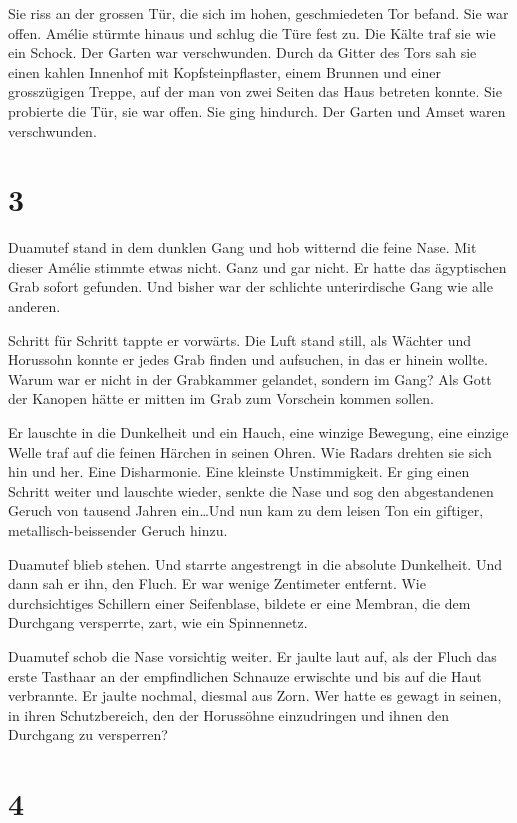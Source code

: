 \documentclass[11pt,titlepage,a5paper]{book}
\begin{document}
Sie riss an der grossen Tür, die sich im hohen, geschmiedeten Tor befand. Sie war offen. Amélie stürmte hinaus und schlug die Türe fest zu. Die Kälte traf sie wie ein Schock. Der Garten war verschwunden. Durch da Gitter des Tors sah sie einen kahlen Innenhof mit Kopfsteinpflaster, einem Brunnen und einer grosszügigen Treppe, auf der man von zwei Seiten das Haus betreten konnte. Sie probierte die Tür, sie war offen. Sie ging hindurch. Der Garten und Amset waren verschwunden.

\section*{3}


Duamutef stand in dem dunklen Gang und hob witternd die feine Nase. Mit dieser Amélie stimmte etwas nicht. Ganz und gar nicht. Er hatte das ägyptischen Grab sofort gefunden. Und bisher war der schlichte unterirdische Gang wie alle anderen. 

Schritt für Schritt tappte er vorwärts. Die Luft stand still, als Wächter und Horussohn konnte er jedes Grab finden und aufsuchen, in das er hinein wollte. Warum war er nicht in der Grabkammer gelandet, sondern im Gang? Als Gott der Kanopen hätte er mitten im Grab zum Vorschein kommen sollen. 

Er lauschte in die Dunkelheit und ein Hauch, eine winzige Bewegung, eine einzige Welle traf auf die feinen Härchen in seinen Ohren. Wie Radars drehten sie sich hin und her. Eine Disharmonie. Eine kleinste Unstimmigkeit. Er ging einen Schritt weiter und lauschte wieder, senkte die Nase und sog den abgestandenen Geruch von tausend Jahren ein\dots Und nun kam zu dem leisen Ton ein giftiger, metallisch-beissender Geruch hinzu. 

Duamutef blieb stehen. Und starrte angestrengt in die absolute Dunkelheit. Und dann sah er ihn, den Fluch. Er war wenige Zentimeter entfernt. Wie durchsichtiges Schillern einer Seifenblase, bildete er eine Membran, die dem Durchgang versperrte, zart, wie ein Spinnennetz.

Duamutef schob die Nase vorsichtig weiter. Er jaulte laut auf, als der Fluch das erste Tasthaar an der empfindlichen Schnauze erwischte und bis auf die Haut verbrannte. Er jaulte nochmal, diesmal aus Zorn. Wer hatte es gewagt in seinen, in ihren Schutzbereich, den der Horussöhne einzudringen und ihnen den Durchgang zu versperren?

\section*{4}
\end{document}
